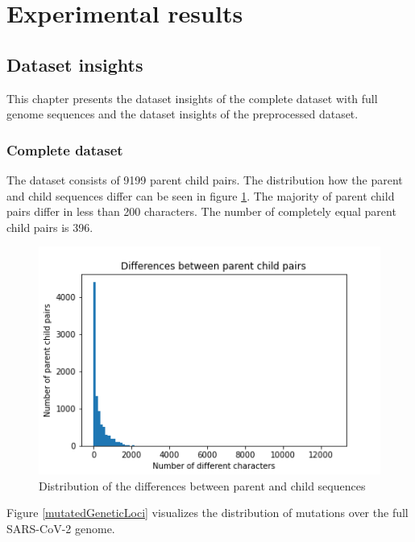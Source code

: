 \section{Experimental results} \label{experiments}

\subsection{Dataset insights}  \label{ch:experimentsA}

This chapter presents the dataset insights of the complete dataset with full genome sequences and the dataset insights of the preprocessed dataset.

\subsubsection{Complete dataset}  \label{ch:experimentsAa}

The dataset consists of 9199 parent child pairs.
The distribution how the parent and child sequences differ can be seen in figure \ref{distributionDifferencesParentChild}. The majority of parent child pairs differ in less than 200 characters. The number of completely equal parent child pairs is 396.

\begin{figure}[ht]
	\centering
	\includegraphics[width=1.0\linewidth]{figures/distributionDifferencesParentChild.png}
	\caption{Distribution of the differences between parent and child sequences \cite{own representation}}
	\label{distributionDifferencesParentChild}
\end{figure}

Figure \ref{mutatedGeneticLoci} visualizes the distribution of mutations over the full \ac{SARS-CoV-2} genome.

